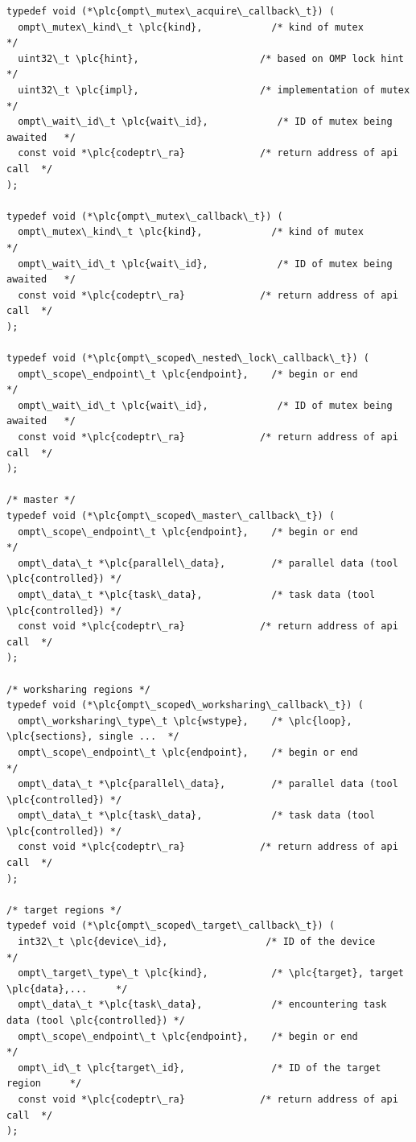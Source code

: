 \documentclass{article}
\begin{document}
\begin{boxedcode}
\begin{verbatim}
typedef void (*\plc{ompt\_mutex\_acquire\_callback\_t}) ( 
  ompt\_mutex\_kind\_t \plc{kind},            /* kind of mutex               */
  uint32\_t \plc{hint},                     /* based on OMP lock hint      */
  uint32\_t \plc{impl},                     /* implementation of mutex     */
  ompt\_wait\_id\_t \plc{wait\_id},            /* ID of mutex being awaited   */
  const void *\plc{codeptr\_ra}             /* return address of api call  */          
);

typedef void (*\plc{ompt\_mutex\_callback\_t}) ( 
  ompt\_mutex\_kind\_t \plc{kind},            /* kind of mutex               */ 
  ompt\_wait\_id\_t \plc{wait\_id},            /* ID of mutex being awaited   */
  const void *\plc{codeptr\_ra}             /* return address of api call  */          
);

typedef void (*\plc{ompt\_scoped\_nested\_lock\_callback\_t}) ( 
  ompt\_scope\_endpoint\_t \plc{endpoint},    /* begin or end                */ 
  ompt\_wait\_id\_t \plc{wait\_id},            /* ID of mutex being awaited   */
  const void *\plc{codeptr\_ra}             /* return address of api call  */          
);

/* master */
typedef void (*\plc{ompt\_scoped\_master\_callback\_t}) ( 
  ompt\_scope\_endpoint\_t \plc{endpoint},    /* begin or end                */
  ompt\_data\_t *\plc{parallel\_data},        /* parallel data (tool \plc{controlled}) */
  ompt\_data\_t *\plc{task\_data},            /* task data (tool \plc{controlled}) */
  const void *\plc{codeptr\_ra}             /* return address of api call  */
);

/* worksharing regions */
typedef void (*\plc{ompt\_scoped\_worksharing\_callback\_t}) (
  ompt\_worksharing\_type\_t \plc{wstype},    /* \plc{loop}, \plc{sections}, single ...  */
  ompt\_scope\_endpoint\_t \plc{endpoint},    /* begin or end                */
  ompt\_data\_t *\plc{parallel\_data},        /* parallel data (tool \plc{controlled}) */
  ompt\_data\_t *\plc{task\_data},            /* task data (tool \plc{controlled}) */
  const void *\plc{codeptr\_ra}             /* return address of api call  */
);

/* target regions */
typedef void (*\plc{ompt\_scoped\_target\_callback\_t}) ( 
  int32\_t \plc{device\_id},                 /* ID of the device            */
  ompt\_target\_type\_t \plc{kind},           /* \plc{target}, target \plc{data},...     */
  ompt\_data\_t *\plc{task\_data},            /* encountering task data (tool \plc{controlled}) */
  ompt\_scope\_endpoint\_t \plc{endpoint},    /* begin or end                */ 
  ompt\_id\_t \plc{target\_id},               /* ID of the target region     */
  const void *\plc{codeptr\_ra}             /* return address of api call  */
);


\end{verbatim}
\end{boxedcode}
\end{document}
